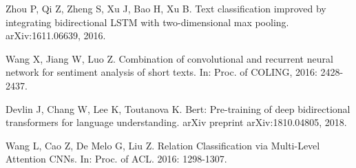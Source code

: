 \documentclass[runningheads]{llncs}
\begin{document}
\begin{thebibliography}{8}
Zhou P, Qi Z, Zheng S, Xu J, Bao H, Xu B. Text classification improved by integrating bidirectional LSTM with two-dimensional max pooling.  arXiv:1611.06639, 2016.

Wang X, Jiang W, Luo Z. Combination of convolutional and recurrent neural network for sentiment analysis of short texts. In: Proc. of COLING, 2016: 2428-2437.

Devlin J, Chang W, Lee K, Toutanova K. Bert: Pre-training of deep bidirectional transformers for language understanding. arXiv preprint arXiv:1810.04805, 2018.

Wang L, Cao Z, De Melo G, Liu Z. Relation Classification via Multi-Level Attention CNNs. In: Proc. of ACL. 2016: 1298-1307.



\end{thebibliography}
\end{document}
